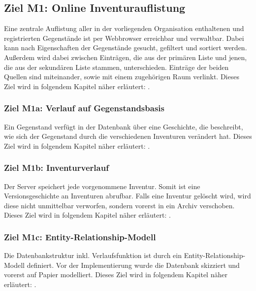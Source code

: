 \documentclass[
    headings=optiontotocandhead,%
    twoside,
    numbers=noenddot,%
    toc=flat, %
    12pt, %
    titlepage, %
    parskip=full, %
    listof=totoc, %
    listof=flat, %
    numbers=noenddot, %
    bibliography=totoc, %
    a4paper,DIV=14,
    BCOR=15mm,
]{scrbook}
\begin{document}
\subsection*{Ziel M1: Online Inventurauflistung}

Eine zentrale Auflistung aller in der vorliegenden Organisation enthaltenen und registrierten Gegenstände ist per Webbrowser erreichbar und verwaltbar. Dabei kann nach Eigenschaften der Gegenstände gesucht, gefiltert und sortiert werden. Außerdem wird dabei zwischen Einträgen, die aus der primären Liste und jenen, die aus der sekundären Liste stammen, unterschieden. Einträge der beiden Quellen sind miteinander, sowie mit einem zugehörigen Raum verlinkt. 
Dieses Ziel wird in folgendem Kapitel näher erläutert: .

  \subsubsection*{Ziel M1a: Verlauf auf Gegenstandsbasis}

  Ein Gegenstand verfügt in der Datenbank über eine Geschichte, die beschreibt, wie sich der Gegenstand durch die verschiedenen Inventuren verändert hat.
  Dieses Ziel wird in folgendem Kapitel näher erläutert: .

  \subsubsection*{Ziel M1b: Inventurverlauf}

  Der Server speichert jede vorgenommene Inventur. Somit ist eine Versionsgeschichte an Inventuren abrufbar. Falls eine Inventur gelöscht wird, wird diese nicht unmittelbar verworfen, sondern vorerst in ein Archiv verschoben.
  Dieses Ziel wird in folgendem Kapitel näher erläutert: .
  
  \subsubsection*{Ziel M1c: Entity-Relationship-Modell}

  Die Datenbankstruktur inkl. Verlaufsfunktion ist durch ein Entity-Relationship-Modell definiert. Vor der Implementierung wurde die Datenbank skizziert und vorerst auf Papier modelliert. 
  Dieses Ziel wird in folgendem Kapitel näher erläutert: .
\end{document}
